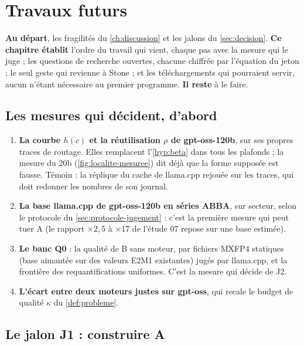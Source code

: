 \chapter{Travaux futurs}\label{ch:futurs}

\begin{origine}
\textbf{Au départ}, les fragilités du \cref{ch:discussion} et les jalons du \cref{sec:decision}.
\textbf{Ce chapitre établit} l'ordre du travail qui vient, chaque pas avec la mesure qui le juge ; les questions de recherche ouvertes, chacune chiffrée par l'équation du jeton ; le seul geste qui revienne à Stone ; et les téléchargements qui pourraient servir, aucun n'étant nécessaire au premier programme.
\textbf{Il reste} à le faire.
\end{origine}

\section{Les mesures qui décident, d'abord}\label{sec:mesures-decident}

\begin{enumerate}
\item \textbf{La courbe $h(c)$ et la réutilisation $\rho$ de gpt-oss-120b}, sur ses propres traces de routage. Elles remplacent l'\cref{hyp:beta} dans tous les plafonds ; la mesure du 20b (\cref{fig:localite-mesuree}) dit déjà que la forme supposée est fausse. Témoin : la réplique du cache de llama.cpp rejouée sur les traces, qui doit redonner les nombres de son journal.
\item \textbf{La base llama.cpp de gpt-oss-120b en séries ABBA}, sur secteur, selon le protocole du \cref{sec:protocole-jugement} : c'est la première mesure qui peut tuer A (le rapport $\times 2{,}5$ à $\times 17$ de l'étude 07 repose sur une base estimée).
\item \textbf{Le banc Q0} : la qualité de B sans moteur, par fichiers MXFP4 statiques (base aimantée sur des valeurs E2M1 existantes) jugés par llama.cpp, et la frontière des requantifications uniformes. C'est la mesure qui décide de J2.
\item \textbf{L'écart entre deux moteurs justes sur gpt-oss}, qui recale le budget de qualité $\kappa$ du \cref{def:probleme}.
\end{enumerate}

\section{Le jalon J1 : construire A}\label{sec:construire-j1}

